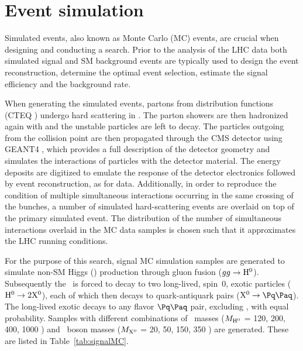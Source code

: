 \section{Event simulation}

Simulated events, also known as Monte Carlo (MC) events, are crucial when 
designing and conducting a search. Prior to the analysis of the LHC data 
both simulated signal and SM background events
are typically used to design the event reconstruction, determine the optimal 
event selection, estimate the signal efficiency and the background rate.

When generating the simulated events, partons from distribution functions 
(CTEQ \cite{Bourilkov:2006cj}) undergo hard scattering in \PYTHIA \cite{PYTHIA}. 
The parton showers are then hadronized again with \PYTHIA and the unstable particles are left to decay.
The particles outgoing from the collision point are then propagated through the CMS detector 
using GEANT4 \cite{GEANT4}, which provides a full description of the detector geometry
and simulates
the interactions of particles with the detector material. The energy deposits are digitized
to emulate the response of the detector electronics followed by event reconstruction,
as for data. Additionally, in order to reproduce the 
condition of multiple simultaneous interactions occurring in the same crossing of the 
bunches, a number of simulated hard-scattering events are overlaid on top of the primary 
simulated event. The distribution of the number of simultaneous interactions overlaid in the
MC data samples is chosen such that it approximates the LHC running conditions.

For the purpose of this search, signal MC simulation samples are generated to
simulate non-SM Higgs (\Higgs) production through gluon fusion ($gg \to \mathrm{H}^{0}$). 
Subsequently the \Higgs~is forced to decay to two long-lived, spin~0, exotic particles
($\mathrm{H}^{0} \to 2\mathrm{X^{0}}$), each of which then decays to quark-antiquark pairs ($\X \to \qq$).
The long-lived exotic \X decays to any flavor $\qq$ pair, excluding \ttbar, with equal probability. Samples
with different combinations of \Higgs~masses ($M_{\mathrm{H}^{0}}$ = 120, 200, 400, 1000 \GeV ) and \X~boson masses
($M_{\mathrm{X^{0}}}$ = 20, 50, 150, 350 \GeV) are generated. These are listed in Table~\ref{tab:signalMC}.

